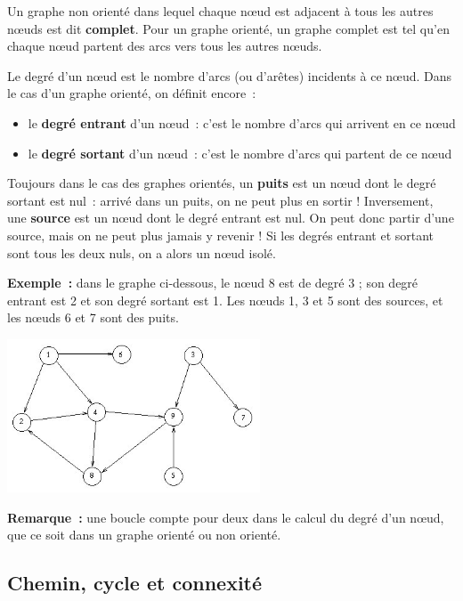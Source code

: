 		Un graphe non orienté dans lequel chaque n{\oe}ud est adjacent 
		à tous les autres n{\oe}uds est dit \textbf{complet}.
		Pour un graphe orienté, un graphe complet est tel qu'en 
		chaque n{\oe}ud partent des arcs vers tous les autres n{\oe}uds.

		Le degré d'un n{\oe}ud est le nombre d'arcs (ou d'arêtes) 
		incidents à ce n{\oe}ud. Dans le cas d'un graphe orienté, 
		on définit encore~:
		
		\begin{itemize}
			\item {
				le \textbf{degré entrant} d'un n{\oe}ud~: 
				c'est le nombre d'arcs qui arrivent en ce n{\oe}ud}
			\item {
				le \textbf{degré sortant} d'un n{\oe}ud~: 
				c'est le nombre d'arcs qui partent de ce n{\oe}ud}
		\end{itemize}
		
		Toujours dans le cas des graphes orientés, un \textbf{puits} 
		est un n{\oe}ud dont le degré sortant est nul~: arrivé dans
		un puits, on ne peut plus en sortir ! Inversement, une 
		\textbf{source} est un n{\oe}ud dont le degré entrant est nul.
		On peut donc partir d'une source, mais on ne peut plus 
		jamais y revenir ! Si les degrés entrant et sortant sont tous
		les deux nuls, on a alors un n{\oe}ud isolé.

		\textbf{Exemple~:} dans le graphe ci-dessous, 
		le n{\oe}ud 8 est de degré 3 ; son degré entrant est 2 
		et son degré sortant est 1.
		Les n{\oe}uds 1, 3 et 5 sont des sources, 
		et les n{\oe}uds 6 et 7 sont des puits.

		\begin{center}
		\includegraphics[width=7.527cm,height=4.56cm]{image/a2012Logique2eme-img046.jpg}
		\end{center}
		
		\textbf{Remarque~:} une boucle compte pour deux dans le calcul du degré 
		d'un n{\oe}ud, que ce soit dans un graphe orienté ou non orienté.
		
	\subsection{Chemin, cycle et connexité}
	

